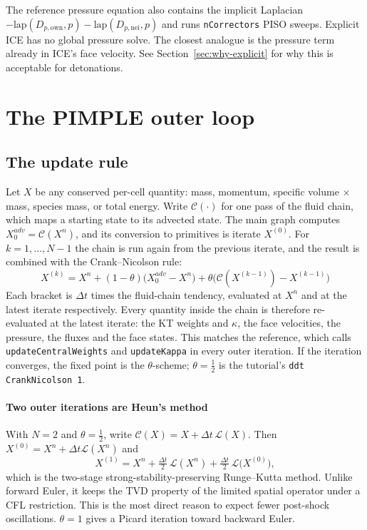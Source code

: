 \documentclass[11pt]{article}
\newcommand{\code}[1]{\texttt{\small #1}}
\newcommand{\own}{\mathrm{own}}
\newcommand{\nei}{\mathrm{nei}}
\newcommand{\dt}{\Delta t}
\begin{document}
\begin{deviation}
The reference pressure equation also contains the implicit Laplacian
$-\mathrm{lap}(D_{p,\own},p)-\mathrm{lap}(D_{p,\nei},p)$ and runs \code{nCorrectors} PISO sweeps.
Explicit ICE has no global pressure solve. The closest analogue is the pressure term already
in ICE's face velocity. See Section~\ref{sec:why-explicit} for why this is acceptable for
detonations.
\end{deviation}

\section{The PIMPLE outer loop}\label{sec:outer}

\subsection{The update rule}
Let $X$ be any conserved per-cell quantity: mass, momentum, specific volume $\times$ mass,
species mass, or total energy. Write $\mathcal C(\cdot)$ for one pass of the fluid chain,
which maps a starting state to its advected state. The main graph computes
$X^{adv}_0=\mathcal C(X^n)$, and its conversion to primitives is iterate $X^{(0)}$. For
$k=1,\dots,N-1$ the chain is run again from the previous iterate, and the result is combined
with the Crank--Nicolson rule:
\begin{equation}
  \boxed{\;X^{(k)} = X^n + (1-\theta)\bigl(X^{adv}_0 - X^n\bigr) + \theta\bigl(\mathcal C(X^{(k-1)}) - X^{(k-1)}\bigr)\;}
  \label{eq:theta}
\end{equation}
Each bracket is $\dt$ times the fluid-chain tendency, evaluated at $X^n$ and at the latest
iterate respectively. Every quantity inside the chain is therefore re-evaluated at the
latest iterate: the KT weights and $\kappa$, the face velocities, the pressure, the fluxes
and the face states. This matches the reference, which calls \code{updateCentralWeights}
and \code{updateKappa} in every outer iteration. If the iteration converges, the fixed point
is the $\theta$-scheme; $\theta=\tfrac12$ is the tutorial's \code{ddt CrankNicolson 1}.

\paragraph{Two outer iterations are Heun's method}
With $N=2$ and $\theta=\tfrac12$, write $\mathcal C(X)=X+\dt\,\mathcal L(X)$. Then
$X^{(0)}=X^n+\dt\mathcal L(X^n)$ and
\begin{equation}
  X^{(1)} = X^n + \tfrac{\dt}{2}\,\mathcal L(X^n) + \tfrac{\dt}{2}\,\mathcal L\bigl(X^{(0)}\bigr),
\end{equation}
which is the two-stage strong-stability-preserving Runge--Kutta method. Unlike forward
Euler, it keeps the TVD property of the limited spatial operator under a CFL restriction. This
is the most direct reason to expect fewer post-shock oscillations. $\theta=1$ gives a
Picard iteration toward backward Euler.
\end{document}
